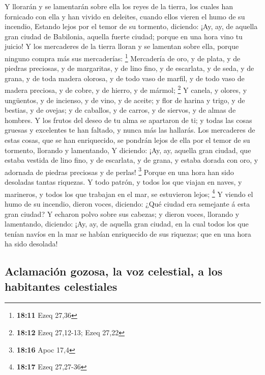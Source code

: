  Y llorarán y se lamentarán sobre ella los reyes de la
tierra, los cuales han fornicado con ella y han vivido en deleites,
cuando ellos vieren el humo de su incendio,  Estando
lejos por el temor de su tormento, diciendo: ¡Ay, ay, de aquella gran
ciudad de Babilonia, aquella fuerte ciudad; porque en una hora vino tu
juicio!  Y los mercaderes de la tierra lloran y se
lamentan sobre ella, porque ninguno compra más sus mercaderías:
\footnote{\textbf{18:11} Ezeq 27,36}  Mercadería de oro,
y de plata, y de piedras preciosas, y de margaritas, y de lino fino, y
de escarlata, y de seda, y de grana, y de toda madera olorosa, y de todo
vaso de marfil, y de todo vaso de madera preciosa, y de cobre, y de
hierro, y de mármol; \footnote{\textbf{18:12} Ezeq 27,12-13; Ezeq 27,22}
 Y canela, y olores, y ungüentos, y de incienso, y de
vino, y de aceite; y flor de harina y trigo, y de bestias, y de ovejas;
y de caballos, y de carros, y de siervos, y de almas de hombres.
 Y los frutos del deseo de tu alma se apartaron de ti; y
todas las cosas gruesas y excelentes te han faltado, y nunca más las
hallarás.  Los mercaderes de estas cosas, que se han
enriquecido, se pondrán lejos de ella por el temor de su tormento,
llorando y lamentando,  Y diciendo: ¡Ay, ay, aquella gran
ciudad, que estaba vestida de lino fino, y de escarlata, y de grana, y
estaba dorada con oro, y adornada de piedras preciosas y de perlas!
\footnote{\textbf{18:16} Apoc 17,4}  Porque en una hora
han sido desoladas tantas riquezas. Y todo patrón, y todos los que
viajan en naves, y marineros, y todos los que trabajan en el mar, se
estuvieron lejos; \footnote{\textbf{18:17} Ezeq 27,27-36}
 Y viendo el humo de su incendio, dieron voces, diciendo:
¿Qué ciudad era semejante á esta gran ciudad?  Y echaron
polvo sobre sus cabezas; y dieron voces, llorando y lamentando,
diciendo: ¡Ay, ay, de aquella gran ciudad, en la cual todos los que
tenían navíos en la mar se habían enriquecido de sus riquezas; que en
una hora ha sido desolada!

\hypertarget{aclamaciuxf3n-gozosa-la-voz-celestial-a-los-habitantes-celestiales}{%
\subsection{Aclamación gozosa, la voz celestial, a los habitantes
celestiales}\label{aclamaciuxf3n-gozosa-la-voz-celestial-a-los-habitantes-celestiales}}

